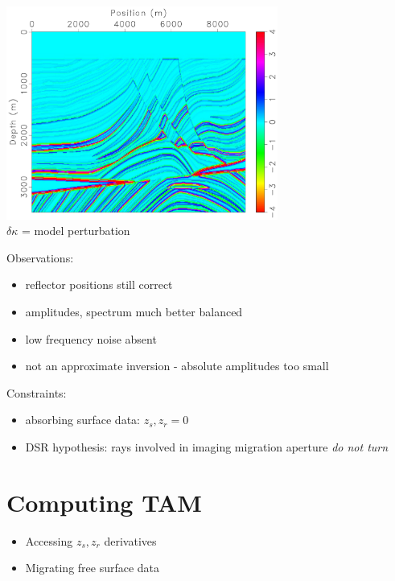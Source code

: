\documentclass[xcolor=dvipsnames,12pt,aspectratio=169]{beamer}
\begin{document}
\begin{frame}
\vspace{-0.5cm}
\begin{center}
\includegraphics[height=7cm]{Fig/fine1dbulk}\\
$\delta \kappa$ = model perturbation
\end{center}
\end{frame}

\begin{frame}
Observations:
\begin{itemize}
\item reflector positions still correct
\item amplitudes, spectrum much better balanced 
\item low frequency noise absent
\item {\color{blue} not an approximate inversion - absolute amplitudes too small}
\end{itemize}

Constraints:
\begin{itemize}
\item absorbing surface data: $z_s,z_r=0$
\item DSR hypothesis: rays involved in imaging migration aperture {\em do not turn}
\end{itemize}
\end{frame}


\section{Computing TAM}

\begin{frame}
\begin{itemize}
\item Accessing $z_s,z_r$ derivatives
\item Migrating free surface data
\end{itemize}
\end{frame}
\end{document}
